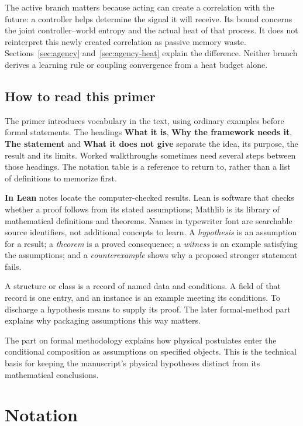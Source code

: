 \documentclass[11pt]{article}
\begin{document}
The active branch matters because acting can create a correlation with the
future: a controller helps determine the signal it will receive. Its bound
concerns the joint controller--world entropy and the actual heat of that
process. It does not reinterpret this newly created correlation as passive
memory waste. Sections~\ref{sec:agency} and~\ref{sec:agency-heat} explain the
difference. Neither branch derives a learning rule or coupling convergence
from a heat budget alone.

\subsection{How to read this primer}

The primer introduces vocabulary in the text, using ordinary examples before
formal statements. The headings \textbf{What it is}, \textbf{Why the framework
needs it}, \textbf{The statement} and \textbf{What it does not give} separate
the idea, its purpose, the result and its limits. Worked walkthroughs sometimes
need several steps between those headings. The notation table is a reference
to return to, rather than a list of definitions to memorize first.

\textbf{In Lean} notes locate the computer-checked results. Lean is software
that checks whether a proof follows from its stated assumptions; Mathlib is
its library of mathematical definitions and theorems. Names in typewriter font
are searchable source identifiers, not additional concepts to learn. A
\emph{hypothesis} is an assumption for a result; a \emph{theorem} is a proved
consequence; a \emph{witness} is an example satisfying the assumptions; and a
\emph{counterexample} shows why a proposed stronger statement fails.

A structure or class is a record of named data and conditions. A field of
that record is one entry, and an instance is an example meeting its conditions.
To discharge a hypothesis means to supply its proof. The later formal-method
part explains why packaging assumptions this way matters.

The part on formal methodology explains how physical postulates enter the
conditional composition as assumptions on specified objects. This is the
technical basis for keeping the manuscript's physical hypotheses distinct from
its mathematical conclusions.

\section{Notation}
\end{document}
